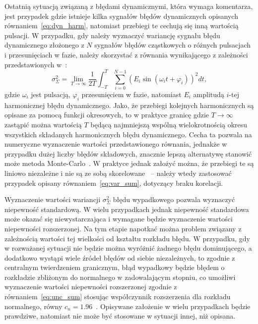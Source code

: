 Ostatnią sytuacją związaną z błędami dynamicznymi, która wymaga komentarza, jest przypadek gdzie istnieje kilka sygnałów błędów dynamicznych opisanych równaniem~\eqref{eq:dyn_harm}, natomiast przebiegi te cechują się inną wartością pulsacji. W przypadku, gdy należy wyznaczyć wariancję sygnału błędu dynamicznego złożonego z $N$ sygnałów błędów cząstkowych o różnych pulsacjach i przesunięciach w fazie, należy skorzystać z równania wynikającego z zależności przedstawionych w~\cite{proakis_dsp}:
\begin{equation}
\sigma_{\Sigma}^{2} = \lim _{T \to \infty} \frac{1}{2T} \int _{-T} ^{T} \sum _{i = 0} ^{N -1} \left( E_{i} \sin \left( \omega_{i} t + \varphi_{i} \right) \right)^{2} dt \label{eq:dyn_multi},
\end{equation}
gdzie $\omega_{i}$ jest pulsacją, $\varphi_{i}$ przesunięciem w fazie, natomiast $E_{i}$ amplitudą $i$-tej harmonicznej błędu dynamicznego. Jako, że przebiegi kolejnych harmonicznych są opisane za pomocą funkcji okresowych, to w praktyce granicę gdzie $T \to \infty$ zastąpić można wartością $T$ będącą najmniejszą wspólną wielokrotnością okresu wszystkich składanych harmonicznych błędu dynamicznego. Cecha ta pozwala na numeryczne wyznaczenie wartości przedstawionego równania, jednakże w przypadku dużej liczby błędów składowych, znacznie lepszą alternatywę stanowić może metoda Monte-Carlo~\cite{roj_annuncertainty, janssen_montecarlo}. W praktyce jednak założyć można, że przebiegi te są liniowo niezależne i nie są ze sobą skorelowane~\cite{proakis_dsp} -- należy wtedy zastosować przypadek opisany równaniem~\eqref{eq:var_sum}, dotyczący braku korelacji.

Wyznaczenie wartości wariancji $\sigma_{\Sigma}^{2}$ błędu wypadkowego pozwala wyznaczyć niepewność standardową. W wielu przypadkach jednak niepewność standardowa może okazać się niewystarczająca i wymagane będzie wyznaczenie wartości niepewności rozszerzonej. Na tym etapie napotkać można problem związany z zależnością wartości tej wielkości od kształtu rozkładu błędu. W przypadku, gdy w rozważanej sytuacji nie będzie można wyróżnić żadnego błędu dominującego, a dodatkowo wystąpi wiele źródeł błędów od siebie niezależnych, to zgodnie z centralnym twierdzeniem granicznym, błąd wypadkowy będzie błędem o rozkładzie zbliżonym do normalnego w zadowalającym stopniu, co umożliwi wyznaczenie wartości niepewności rozszerzonej zgodnie z równaniem~\eqref{eq:unc_sum} stosując współczynnik rozszerzenia dla rozkładu normalnego, równy $c_{n} = 1.96$~\cite{jcgm_guide}. Opisywane założenie w wielu przypadkach będzie prawdziwe, natomiast nie może być stosowane w sytuacji innej, niż opisana.

